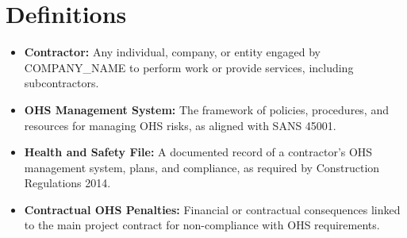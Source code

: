 \documentclass[12pt]{article}
\begin{document}
\section{Definitions}
\begin{itemize}
    \item \textbf{Contractor:} Any individual, company, or entity engaged by {{COMPANY_NAME}} to perform work or provide services, including subcontractors.
    \item \textbf{OHS Management System:} The framework of policies, procedures, and resources for managing OHS risks, as aligned with SANS 45001.
    \item \textbf{Health and Safety File:} A documented record of a contractor’s OHS management system, plans, and compliance, as required by Construction Regulations 2014.
    \item \textbf{Contractual OHS Penalties:} Financial or contractual consequences linked to the main project contract for non-compliance with OHS requirements.
\end{itemize}
\end{document}
